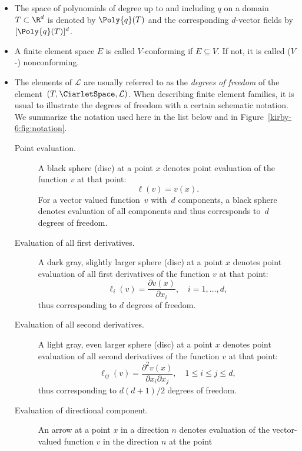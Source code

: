 \begin{itemize}
\item
  The space of polynomials of degree up to and including $q$ on a
  domain $T \subset \R^d$ is denoted by $\Poly{q}(T)$ and the
  corresponding $d$-vector fields by $[\Poly{q}(T)]^d$.
\item
  A finite element space $E$ is called $V$-conforming if $E \subseteq
  V$. If not, it is called ($V$-) nonconforming.
\item The elements of $\mathcal{L}$ are usually referred to as the
  \emph{degrees of freedom} of the element~$(T, \CiarletSpace,
  \mathcal{L})$. When describing finite element families, it is usual
  to illustrate the degrees of freedom with a certain schematic
  notation. We summarize the notation used here in the list below and
  in Figure~\ref{kirby-6:fig:notation}.
  \begin{description}
  \item[Point evaluation.]
    A black sphere (disc) at a point $x$ denotes point
    evaluation of the function $v$ at that point:
    \begin{equation}
      \ell(v) = v(x).
    \end{equation}
    For a vector valued function~$v$ with~$d$ components, a black
    sphere denotes evaluation of all components and thus corresponds
    to~$d$ degrees of freedom.
  \item[Evaluation of all first derivatives.]
    A dark gray, slightly larger sphere (disc) at a point $x$ denotes point
    evaluation of all first derivatives of the function $v$ at that point:
    \begin{equation}
      \ell_i(v) = \frac{\partial v(x)}{\partial x_i}, \quad i
      =1, \ldots, d,
    \end{equation}
    thus corresponding to $d$ degrees of freedom.
  \item[Evaluation of all second derivatives.]
    A light gray, even larger sphere (disc) at a point $x$ denotes point
    evaluation of all second derivatives of the function $v$ at that point:
    \begin{equation}
      \ell_{ij}(v) = \frac{\partial^2 v(x)}{\partial x_i \partial
        x_j}, \quad 1 \leqslant i \leqslant j \leqslant d,
    \end{equation}
    thus corresponding to $d (d + 1) / 2$ degrees of freedom.
  \item[Evaluation of directional component.]
    An arrow at a point $x$ in a direction $n$ denotes evaluation of
    the vector-valued function $v$ in the direction $n$ at the point

\end{description}
\end{itemize}
